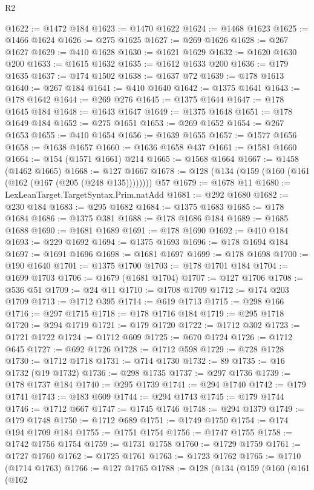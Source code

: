 \begin{lexlean}{R2}
\begin{coremodule}
@1622 := @1472 @184
@1623 := @1470 @1622
@1624 := @1468 @1623
@1625 := @1466 @1624
@1626 := @275 @1625
@1627 := @269 @1626
@1628 := @267 @1627
@1629 := @410 @1628
@1630 := @1621 @1629
@1632 := @1620 @1630 @200
@1633 := @1615 @1632
@1635 := @1612 @1633 @200
@1636 := @179 @1635
@1637 := @174 @1502
@1638 := @1637 @72
@1639 := @178 @1613
@1640 := @267 @184
@1641 := @410 @1640
@1642 := @1375 @1641
@1643 := @178 @1642
@1644 := @269 @276
@1645 := @1375 @1644
@1647 := @178 @1645 @184
@1648 := @1643 @1647
@1649 := @1375 @1648
@1651 := @178 @1649 @184
@1652 := @275 @1651
@1653 := @269 @1652
@1654 := @267 @1653
@1655 := @410 @1654
@1656 := @1639 @1655
@1657 := @1577 @1656
@1658 := @1638 @1657
@1660 := @1636 @1658 @437
@1661 := @1581 @1660
@1664 := @154 (@1571 @1661) @214
@1665 := @1568 @1664
@1667 := @1458 (@1462 @1665)
@1668 := @127 @1667
@1678 := @128 (@134 (@159 (@160 (@161 (@162 (@167 (@205 (@248 @135)))))))) @57
@1679 := @1678 @11
@1680 := LexLeanTarget.TargetSyntax.Prim.natAdd
@1681 := @292 @1680
@1682 := @230 @184
@1683 := @295 @1682
@1684 := @1375 @1683
@1685 := @178 @1684
@1686 := @1375 @381
@1688 := @178 @1686 @184
@1689 := @1685 @1688
@1690 := @1681 @1689
@1691 := @178 @1690
@1692 := @410 @184
@1693 := @229 @1692
@1694 := @1375 @1693
@1696 := @178 @1694 @184
@1697 := @1691 @1696
@1698 := @1681 @1697
@1699 := @178 @1698
@1700 := @190 @1640
@1701 := @1375 @1700
@1703 := @178 @1701 @184
@1704 := @1699 @1703
@1706 := @1679 (@1681 @1704)
@1707 := @127 @1706
@1708 := @536 @51
@1709 := @24 @11
@1710 := @1708 @1709
@1712 := @174 @203 @1709
@1713 := @1712 @395
@1714 := @619 @1713
@1715 := @298 @166
@1716 := @297 @1715
@1718 := @178 @1716 @184
@1719 := @295 @1718
@1720 := @294 @1719
@1721 := @179 @1720
@1722 := @1712 @302
@1723 := @1721 @1722
@1724 := @1712 @609
@1725 := @670 @1724
@1726 := @1712 @645
@1727 := @692 @1726
@1728 := @1712 @598
@1729 := @728 @1728
@1730 := @1712 @1718
@1731 := @714 @1730
@1732 := 89
@1735 := @16 @1732 (@19 @1732)
@1736 := @298 @1735
@1737 := @297 @1736
@1739 := @178 @1737 @184
@1740 := @295 @1739
@1741 := @294 @1740
@1742 := @179 @1741
@1743 := @183 @609
@1744 := @294 @1743
@1745 := @179 @1744
@1746 := @1712 @667
@1747 := @1745 @1746
@1748 := @294 @1379
@1749 := @179 @1748
@1750 := @1712 @689
@1751 := @1749 @1750
@1754 := @174 @194 @1709 @184
@1755 := @1751 @1754
@1756 := @1747 @1755
@1758 := @1742 @1756 @1754
@1759 := @1731 @1758
@1760 := @1729 @1759
@1761 := @1727 @1760
@1762 := @1725 @1761
@1763 := @1723 @1762
@1765 := @1710 (@1714 @1763)
@1766 := @127 @1765
@1788 := @128
    (@134
      (@159
        (@160
          (@161
            (@162

\end{coremodule}
\end{lexlean}
